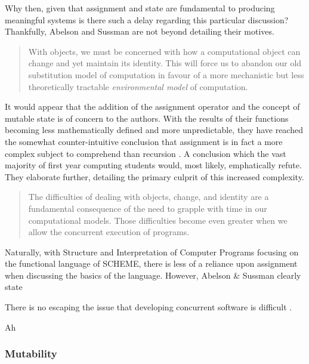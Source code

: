 \documentclass[12pt,a4paper]{article}
\begin{document}
Why then, given that assignment and state are fundamental to producing meaningful systems \cite{structureAndInterpretation} is there such a delay regarding this particular discussion? Thankfully, Abelson and Sussman are not beyond detailing their motives.

\begin{quote}
    With objects, we must be concerned with how a computational object can change and yet maintain its identity. This will force us to abandon our old substitution model of computation in favour of a more mechanistic but less theoretically tractable \textit{environmental model} of computation. \cite{structureAndInterpretation}
\end{quote}

It would appear that the addition of the assignment operator and the concept of mutable state is of concern to the authors. With the results of their functions becoming less mathematically defined and more unpredictable, they have reached the somewhat counter-intuitive conclusion that assignment is in fact a more complex subject to comprehend than recursion \cite{structureAndInterpretation}. A conclusion which the vast majority of first year computing students would, most likely, emphatically refute. They elaborate further, detailing the primary culprit of this increased complexity.

\begin{quote}
    The difficulties of dealing with objects, change, and identity are a fundamental consequence of the need to grapple with time in our computational models. Those difficulties become even greater when we allow the concurrent execution of programs. \cite{structureAndInterpretation}
\end{quote}


Naturally, with Structure and Interpretation of Computer Programs focusing on the functional language of SCHEME, there is less of a reliance upon assignment when discussing the basics of the language. However, Abelson \& Sussman clearly state 

There is no escaping the issue that developing concurrent software is difficult \cite{concurrencyChallenges,theConcurrencyChallenge}.

Ah \cite{theConcurrencyChallenge} \cite{concurrencyChallenges} \cite{theConcurrencyChallenge}


\subsubsection{Mutability}
\end{document}
